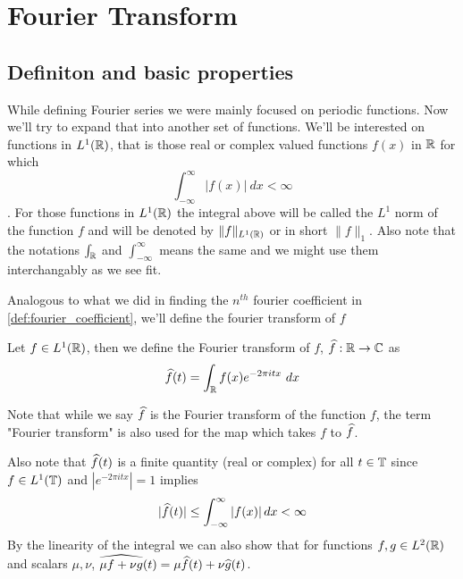 \chapter{Fourier Transform}

\section{Definiton and basic properties}
  While defining Fourier series we were mainly focused on periodic functions. Now we'll try to expand that into another set of functions. We'll be interested on functions in $L^1(\mathbb R)$, that is those real or complex valued functions $f(x)$ in $\mathbb R$ for which $$\int_{-\infty}^{\infty} |f(x)| \ dx < \infty$$. For those functions in $L^1(\mathbb R)$ the integral above will be called the $L^1$ norm of the function $f$ and will be denoted by $\|f\|_{L^1(\mathbb R)}$ or in short $\|f\|_1$. Also note that the notations $\int_{\mathbb R}$ and $\int_{-\infty}^{\infty}$ means the same and we might use them interchangably as we see fit.

  Analogous to what we did in finding the $n^{th}$ fourier coefficient in \autoref{def:fourier_coefficient}, we'll define the fourier transform of $f$

  \begin{definition}
    \label{def:fourier_transform_of_f}
    Let $f \in L^1(\mathbb R)$, then we define the Fourier transform of $f$, $\widehat{f} : \mathbb R \to \mathbb C$ as $$\hatf(t) = \int_{\R} f(x) e^{-2 \pi itx} \ dx$$
  \end{definition}
  Note that while we say $\widehat{f}$ is the Fourier transform of the function $f$, the term "Fourier transform" is also used for the map which takes $f$ to $\widehat{f}$.

  Also note that $\widehat{f}(t)$ is a finite quantity (real or complex) for all $t \in \mathbb T$ since $f\in L^1(\mathbb T)$ and $|e^{-2 \pi itx}| = 1$ implies $$|\widehat{f}(t)| \le \int_{-\infty}^{\infty}\left|f(x)\right| dx < \infty$$ By the linearity of the integral we can also show that for functions $f, g \in L^2(\mathbb R)$ and scalars $\mu, \nu$, $\widehat{\mu f + \nu g}(t) = \mu \widehat{f}(t) + \nu\widehat{g}(t)$.

